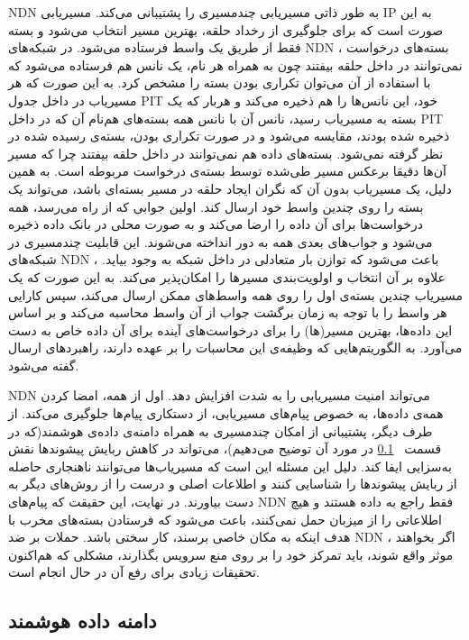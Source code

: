 NDN
 به طور ذاتی مسیریابی چندمسیری را پشتیبانی می‌کند. مسیریابی IP به این صورت است که برای جلوگیری از رخداد حلقه، بهترین مسیر انتخاب می‌شود و بسته فقط از طریق یک واسط فرستاده می‌شود. در شبکه‌های ‌NDN ، بسته‌های درخواست نمی‌توانند در داخل حلقه بیفتند چون به همراه هر نام، یک نانس هم فرستاده می‌شود که با استفاده از آن می‌توان تکراری بودن بسته را مشخص کرد. به این صورت که هر مسیریاب در داخل جدول PIT  خود، این نانس‌ها را هم ذخیره می‌کند و هربار که یک بسته به مسیریاب رسید، نانس آن با نانس همه بسته‌‌های هم‌نام آن که در داخل PIT  ذخیره شده بودند، مقایسه می‌شود و در صورت تکراری بودن، بسته‌ی رسیده شده در نظر گرفته نمی‌شود. بسته‌های داده هم نمی‌توانند در داخل حلقه بیفتند چرا که مسیر آن‌ها دقیقا برعکس مسیر طی‌شده توسط بسته‌ی درخواست مربوطه است. به همین دلیل، یک مسیریاب بدون آن که نگران ایجاد حلقه در مسیر بسته‌ای باشد، می‌تواند یک بسته را روی چندین واسط خود ارسال کند. اولین جوابی که از راه می‌رسد، همه درخواست‌ها برای آن داده را ارضا می‌کند و به صورت محلی در بانک داده ذخیره می‌شود و جواب‌های بعدی همه به دور انداخته می‌شوند. 
این قابلیت چندمسیری در شبکه‌های NDN ، باعث می‌شود که توازن بار متعادلی در داخل شبکه به وجود بیاید. علاوه بر آن انتخاب و اولویت‌بندی مسیرها را امکان‌پذیر می‌کند. به این صورت که یک مسیریاب چندین بسته‌ی اول را روی همه واسط‌های ممکن ارسال می‌کند، سپس کارایی هر واسط را با توجه به زمان برگشت جواب از آن واسط محاسبه می‌کند و بر اساس این داده‌ها، بهترین مسیر(ها) را برای درخواست‌های آینده برای آن داده خاص به دست می‌آورد. به الگوریتم‌هایی که وظیفه‌ی این محاسبات را بر عهده دارند، راهبردهای ارسال گفته می‌شود. 


NDN
می‌تواند امنیت مسیریابی را به شدت افزایش دهد. اول از همه، امضا کردن همه‌ی داده‌‌ها، به خصوص  پیام‌های مسیریابی، از دستکاری پیام‌ها جلوگیری می‌کند. از طرف دیگر، پشتیبانی از امکان چندمسیری به همراه دامنه‌ی داده‌ی هوشمند(که در قسمت ~\ref{intelligent plane} در مورد آن توضیح می‌دهیم)، می‌تواند در کاهش ربایش پیشوندها نقش به‌سزایی ایفا کند. دلیل این مسئله این است که مسیریاب‌ها می‌توانند ناهنجاری حاصله از ربایش پیشوندها را شناسایی کنند و اطلاعات اصلی و درست را از روش‌های دیگر به دست بیاورند. در نهایت، این حقیقت که پیام‌های NDN  فقط راجع به داده هستند و هیچ اطلاعاتی را از میزبان حمل نمی‌کنند، باعث می‌شود که فرستادن بسته‌‌های مخرب با هدف اینکه به مکان خاصی برسند، کار سختی باشد. 
حملات بر ضد NDN ، اگر بخواهند موثر واقع شوند، باید تمرکز خود را بر روی منع سرویس بگذارند، مشکلی که هم‌اکنون تحقیقات زیادی برای رفع آن در حال انجام است. 

 
\subsection{دامنه داده هوشمند}
\label{intelligent plane}

